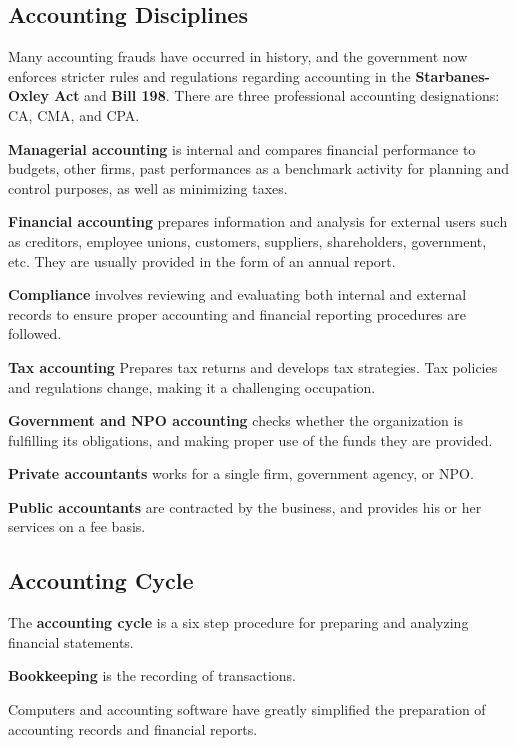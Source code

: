 \documentclass[english, 12pt]{article}
\begin{document}
\subsection{Accounting Disciplines}
Many accounting frauds have occurred in history, and the government now enforces stricter rules and regulations regarding accounting in the \textbf{Starbanes-Oxley Act} and \textbf{Bill 198}. There are three professional accounting designations: CA, CMA, and CPA.
\begin{defn}
\textbf{Managerial accounting} is internal and compares financial performance to budgets, other firms, past performances as a benchmark activity for planning and control purposes, as well as minimizing taxes.
\end{defn}
\begin{defn}
\textbf{Financial accounting} prepares information and analysis for external users such as creditors, employee unions, customers, suppliers, shareholders, government, etc. They are usually provided in the form of an annual report.
\end{defn}
\begin{defn}
\textbf{Compliance} involves reviewing and evaluating both internal and external records to ensure proper accounting and financial reporting procedures are followed.
\end{defn}
\begin{defn}
\textbf{Tax accounting} Prepares tax returns and develops tax strategies. Tax policies and regulations change, making it a challenging occupation.
\end{defn}
\begin{defn}
\textbf{Government and NPO accounting} checks whether the organization is fulfilling its obligations, and making proper use of the funds they are provided.
\end{defn}
\begin{defn}
\textbf{Private accountants} works for a single firm, government agency, or NPO.
\end{defn}
\begin{defn}
\textbf{Public accountants} are contracted by the business, and provides his or her services on a fee basis.
\end{defn}
\subsection{Accounting Cycle}
\begin{defn}
The \textbf{accounting cycle} is a six step procedure for preparing and analyzing financial statements.
\end{defn}
\begin{defn}
\textbf{Bookkeeping} is the recording of transactions.
\end{defn}
Computers and accounting software have greatly simplified the preparation of accounting records and financial reports.
\end{document}
